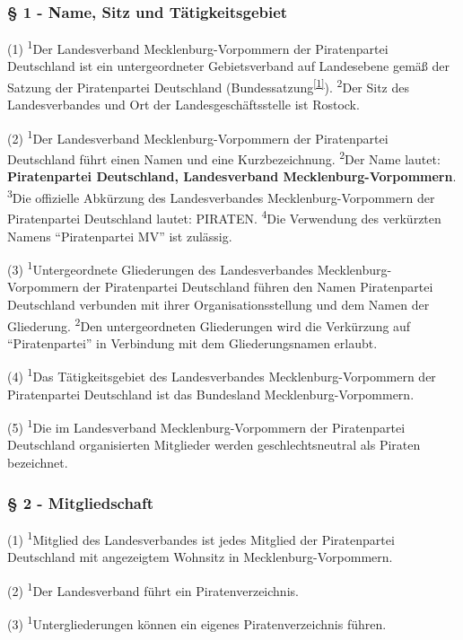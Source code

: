 \subsubsection{§ 1 - Name, Sitz und Tätigkeitsgebiet}

(1) \textsuperscript{1}Der Landesverband Mecklenburg-Vorpommern der
Piratenpartei Deutschland ist ein untergeordneter Gebietsverband auf
Landesebene gemäß der Satzung der Piratenpartei Deutschland
(Bundessatzung\textsuperscript{\href{\#cite\_note-0}{{[}1{]}}}).
\textsuperscript{2}Der Sitz des Landesverbandes und Ort der
Landesgeschäftsstelle ist Rostock.

(2) \textsuperscript{1}Der Landesverband Mecklenburg-Vorpommern der
Piratenpartei Deutschland führt einen Namen und eine Kurzbezeichnung.
\textsuperscript{2}Der Name lautet: \textbf{Piratenpartei Deutschland,
Landesverband Mecklenburg-Vorpommern}. \textsuperscript{3}Die offizielle
Abkürzung des Landesverbandes Mecklenburg-Vorpommern der Piratenpartei
Deutschland lautet: PIRATEN. \textsuperscript{4}Die Verwendung des
verkürzten Namens ``Piratenpartei MV'' ist zulässig.

(3) \textsuperscript{1}Untergeordnete Gliederungen des Landesverbandes
Mecklenburg-Vorpommern der Piratenpartei Deutschland führen den Namen
Piratenpartei Deutschland verbunden mit ihrer Organisationsstellung und
dem Namen der Gliederung. \textsuperscript{2}Den untergeordneten
Gliederungen wird die Verkürzung auf ``Piratenpartei'' in Verbindung mit
dem Gliederungsnamen erlaubt.

(4) \textsuperscript{1}Das Tätigkeitsgebiet des Landesverbandes
Mecklenburg-Vorpommern der Piratenpartei Deutschland ist das Bundesland
Mecklenburg-Vorpommern.

(5) \textsuperscript{1}Die im Landesverband Mecklenburg-Vorpommern der
Piratenpartei Deutschland organisierten Mitglieder werden
geschlechtsneutral als Piraten bezeichnet.

\subsubsection{§ 2 - Mitgliedschaft}

(1) \textsuperscript{1}Mitglied des Landesverbandes ist jedes Mitglied
der Piratenpartei Deutschland mit angezeigtem Wohnsitz in
Mecklenburg-Vorpommern.

(2) \textsuperscript{1}Der Landesverband führt ein Piratenverzeichnis.

(3) \textsuperscript{1}Untergliederungen können ein eigenes
Piratenverzeichnis führen.


